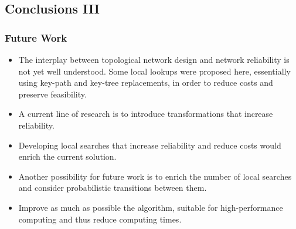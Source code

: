 \subsection{Conclusions III}
\begin{frame} \frametitle{Future Work}
\begin{block} {}
   	\begin{scriptsize}
 	 \begin{itemize}
 	 	\item The interplay between topological network design and network reliability is not yet well understood. Some local lookups were proposed here, essentially using key-path and key-tree replacements, in order to reduce costs and preserve feasibility.
 	 	\item A current line of research is to introduce transformations that increase reliability.
 	 	\item Developing local searches that increase reliability and reduce costs would enrich the current solution.
 	 	\item Another possibility for future work is to enrich the number of local searches and consider probabilistic transitions between them.
 	 	\item Improve as much as possible the algorithm, suitable for high-performance computing and thus reduce computing times.
 	 \end{itemize}  
 	\end{scriptsize}
 \end{block} 	   
\end{frame}